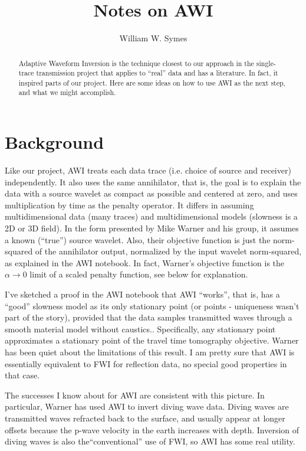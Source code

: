 \title{Notes on AWI}
\author{William W. Symes}

\begin{abstract}
Adaptive Waveform Inversion is the technique closest to our approach in the single-trace transmission project that applies to ``real'' data and has a literature. In fact, it inspired parts of our project. Here are some ideas on how to use AWI as the next step, and what we might accomplish. 
\end{abstract}

\section{Background}
Like our project, AWI treats each data trace (i.e. choice of source and receiver) independently. It also uses the same annihilator,  that is, the goal is to explain the data with a source wavelet as compact as possible and centered at zero, and uses multiplication by time as the penalty operator. It differs in assuming multidimensional data (many traces) and multidimensional models (slowness is a 2D or 3D field). In the form presented by Mike Warner and his group, it assumes a known (``true'') source wavelet. Also, their objective function is just the norm-squared of the annihilator output, normalized by the input wavelet norm-squared, as explained in the AWI notebook. In fact, Warner's objective function is the $\alpha \rightarrow 0$ limit of a scaled penalty function, see below for explanation.

I've sketched a proof in the AWI notebook that AWI ``works'', that is, has a ``good'' slowness model as its only stationary point (or points - uniqueness wasn't part of the story), provided that the data samples transmitted waves through a smooth material model without caustics.. Specifically, any stationary point approximates a stationary point of the travel time tomography objective. Warner has been quiet about the limitations of this result. I am pretty sure that AWI is essentially equivalent to FWI for reflection data, no special good properties in that case.

The successes I know about for AWI are consistent with this picture. In particular, Warner has used AWI to invert diving wave data. Diving waves are transmitted waves refracted back to the surface, and usually appear at longer offsets because the p-wave velocity in the earth increases with depth. Inversion of diving waves is also the``conventional'' use of FWI, so AWI has some real utility.

